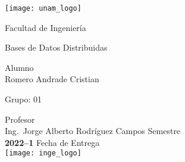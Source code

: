 \begin{titlepage}
  \centering
    \texttt{[image: unam\_logo]}\vspace{0.5cm}

    {\scshape{\Huge Facultad de Ingeniería\par{}}}\vspace{0.25cm}

    {\scshape{\Large Bases de Datos Distribuidas\par{}}}\vfill{}


    {\huge \textbf{\tituloPractica{}}}\vfill{}


    {\Large Alumno\\Romero Andrade Cristian}\vfill{}

      {\large Grupo: 01\par{}}\vfill{}

    {\large Profesor\\Ing.~Jorge Alberto Rodríguez Campos}\vfill{}
    \vfil{}
    {\large Semestre\\\textbf{2022--1}}
    \vfill{}
    {\large Fecha de Entrega\\\fechaEntrega{}}
    \vfill{}
    \texttt{[image: inge\_logo]}

\end{titlepage}
